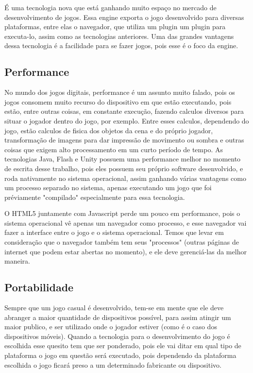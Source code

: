 É uma tecnologia nova que está ganhando muito espaço no mercado de
desenvolvimento de jogos. Essa engine exporta o jogo desenvolvido para
diversas plataformas, entre elas o navegador, que utiliza um plugin um
plugin para executa-lo, assim como as tecnologias anteriores.
Uma das grandes vantagens dessa tecnologia é a facilidade para se
fazer jogos, pois esse é o foco da engine.


\subsection{Performance}

No mundo dos jogos digitais, performance é um assunto muito falado,
pois os jogos consomem muito recurso do dispositivo em que estão
executando, pois estão, entre outras coisas, em constante execução, fazendo
calculos diversos para situar o jogador dentro do jogo, por exemplo.
Entre esses calculos, dependendo do jogo, estão calculos de fisica dos
objetos da cena e do próprio jogador, transformação de imagens para
dar impressão de movimento ou sombra e outras coisas que exigem alto
processamento em um curto período de tempo.
As tecnologias Java, Flash e Unity possuem uma performance melhor no
momento de escrita desse trabalho, pois eles possuem seu próprio
software desenvolvido, e roda nativamente no sistema operacional,
assim ganhando várias vantagens como um processo separado no sistema,
apenas executando um jogo que foi préviamente "compilado"
especialmente para essa tecnologia.

O HTML5 juntamente com Javascript perde um pouco em performance, pois
o sistema operacional vê apenas um navegador como processo, e esse
navegador vai fazer a interface entre o jogo e o sistema operacional.
Temos que levar em consideração que o navegador também tem seus
"processos" (outras páginas de internet que podem estar abertas no
momento), e ele deve gerenciá-las da melhor maneira.


\subsection{Portabilidade}

Sempre que um jogo casual é desenvolvido, tem-se em mente que ele deve
abranger a maior quantidade de dispositivos possível, para assim
atingir um maior publico, e ser utilizado onde o jogador estiver (como
é o caso dos dispositivos móveis). Quando a tecnologia para o
desenvolvimento do jogo é escolhida esse quesito tem que ser
ponderado, pois ele vai ditar em qual tipo de plataforma o jogo em
questão será executado, pois dependendo da plataforma escolhida o jogo ficará preso
a um determinado fabricante ou dispositivo.

